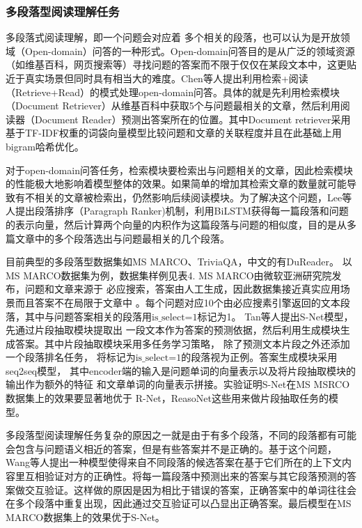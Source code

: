 \subsubsection{多段落型阅读理解任务}
多段落式阅读理解，即一个问题会对应着
多个相关的段落，也可以认为是开放领域（Open-domain）问答的一种形式。Open-domain问答目的是从广泛的领域资源（如维基百科，网页搜索等）寻找问题的答案而不限于仅仅在某段文本中，这更贴近于真实场景但同时具有相当大的难度。Chen等人提出利用检索+阅读（Retrieve+Read）的模式处理open-domain问答。具体的就是先利用检索模块（Document Retriever）从维基百科中获取5个与问题最相关的文章，然后利用阅读器（Document Reader）预测出答案所在的位置。其中Document retriever采用基于TF-IDF权重的词袋向量模型比较问题和文章的关联程度并且在此基础上用bigram哈希优化。

对于open-domain问答任务，检索模块要检索出与问题相关的文章，因此检索模块的性能极大地影响着模型整体的效果。如果简单的增加其检索文章的数量就可能导致有不相关的文章被检索出，仍然影响后续阅读模块。为了解决这个问题，Lee等人提出段落排序（Paragraph Ranker)机制，利用BiLSTM获得每一篇段落和问题的表示向量，然后计算两个向量的内积作为这篇段落与问题的相似度，目的是从多篇文章中的多个段落选出与问题最相关的几个段落。


目前典型的多段落型数据集如MS MARCO、TriviaQA，中文的有DuReader。
以MS MARCO数据集为例，数据集样例见表4. MS MARCO由微软亚洲研究院发布，问题和文章来源于
必应搜索，答案由人工生成，因此数据集接近真实应用场景而且答案不在局限于文章中
。每个问题对应10个由必应搜素引擎返回的文本段落，其中与问题答案相关的段落用$\text{is\_select=1}$标记为1。
Tan等人提出S-Net模型，
先通过片段抽取模块提取出
一段文本作为答案的预测依据，然后利用生成模块生成答案。其中片段抽取模块采用多任务学习策略，
除了预测文本片段之外还添加一个段落排名任务，
将标记为$\text{is\_select=1}$的段落视为正例。答案生成模块采用seq2seq模型，
其中encoder端的输入是问题单词的向量表示以及将片段抽取模块的输出作为额外的特征
和文章单词的向量表示拼接。实验证明S-Net在MS MSRCO数据集上的效果要显著地优于
R-Net，ReasoNet这些用来做片段抽取任务的模型。

多段落型阅读理解任务复杂的原因之一就是由于有多个段落，不同的段落都有可能会包含与问题语义相近的答案，但是有些答案并不是正确的。基于这个问题，Wang等人提出一种模型使得来自不同段落的候选答案在基于它们所在的上下文内容里互相验证对方的正确性。将每一篇段落中预测出来的答案与其它段落预测的答案做交互验证。这样做的原因是因为相比于错误的答案，正确答案中的单词往往会在多个段落中重复出现，因此通过交互验证可以凸显出正确答案。最后模型在MS MARCO数据集上的效果优于S-Net。



